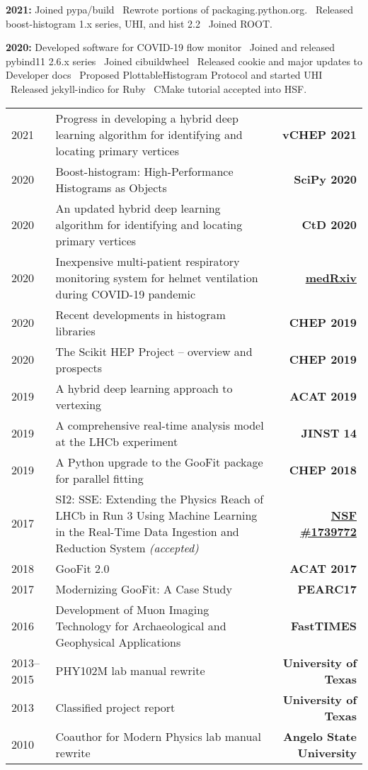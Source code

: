 \documentclass[10pt,letterpaper,english]{moderncv}
\begin{document}

\textbf{2021:} Joined pypa/build \bullet\ Rewrote portions of packaging.python.org. \bullet\ Released boost-histogram 1.x series, UHI, and hist 2.2 \bullet\ Joined ROOT.

\textbf{2020:} Developed software for COVID-19 flow monitor \bullet\ Joined and released pybind11 2.6.x series \bullet\ Joined cibuildwheel \bullet\ Released cookie and major updates to Developer docs \bullet\ Proposed PlottableHistogram Protocol and started UHI \bullet\ Released jekyll-indico for Ruby \bullet\ CMake tutorial accepted into HSF.


\begin{tabularx}{\textwidth}{p{.8in}X>{\bfseries}r}
2021 & Progress in developing a hybrid deep learning algorithm for identifying and locating primary vertices & vCHEP 2021 \\
2020 & Boost-histogram: High-Performance Histograms as Objects & SciPy 2020 \\
2020 & An updated hybrid deep learning algorithm for identifying and locating primary vertices & CtD 2020 \\
2020 & Inexpensive multi-patient respiratory monitoring system for helmet ventilation during COVID-19 pandemic & \href{https://doi.org/10.1101/2020.06.29.20141283}{medRxiv} \\
2020 & Recent developments in histogram libraries & CHEP 2019 \\
2020 & The Scikit HEP Project -- overview and prospects & CHEP 2019 \\
2019 & A hybrid deep learning approach to vertexing &  ACAT 2019 \\ 
2019 & A comprehensive real-time analysis model at the LHCb experiment & JINST 14 \\
2019 & A Python upgrade to the GooFit package for parallel fitting & CHEP 2018 \\
2017 & SI2: SSE: Extending the Physics Reach of LHCb in Run 3 Using Machine Learning in the Real-Time Data Ingestion and Reduction System  \textit{(accepted)} & \href{https://nsf.gov/awardsearch/showAward?AWD_ID=1739772}{NSF \#1739772} \\ %
2018 & GooFit 2.0 & ACAT 2017 \\ %
2017 & Modernizing GooFit: A Case Study & PEARC17 \\ 
2016 & Development of Muon Imaging Technology
for Archaeological and Geophysical Applications & FastTIMES \\
2013--2015 & PHY102M lab manual rewrite & University of Texas \\
2013 & Classified project report & University of Texas\\
2010 & Coauthor for Modern Physics lab manual rewrite & Angelo State University\\
\end{tabularx}
\end{document}
